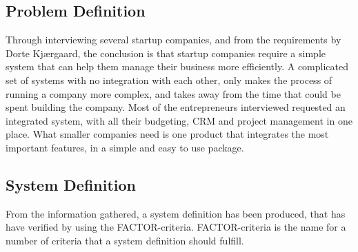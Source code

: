 



\subsection{Problem Definition}


Through interviewing several startup companies, and from the requirements by Dorte Kjærgaard, the conclusion is that startup companies require a simple system that can help them manage their business more efficiently. A complicated set of systems with no integration with each other, only makes the process of running a company more complex, and takes away from the time that could be spent building the company. Most of the entrepreneurs interviewed requested an integrated system, with all their budgeting, CRM and project management in one place. What smaller companies need is one product that integrates the most important features, in a simple and easy to use package.
\\


\subsection{System Definition}

From the information gathered, a system definition has been produced, that has have verified by using the FACTOR-criteria\citep{FACTORPage}. FACTOR-criteria is the name for a number of criteria that a system definition should fulfill.

